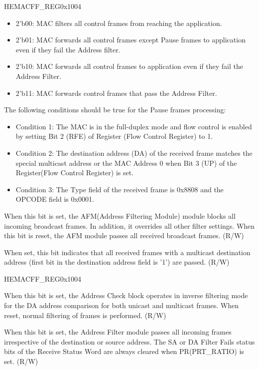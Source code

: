 \begin{register}{H}{EMACFF\_REG}{0x1004}
\begin{regdesc}
\begin{reglist}
\begin{itemize}
\item 2'b00: MAC filters all control frames from reaching the application. \item 2'b01: MAC forwards all control frames except Pause frames to application even if they fail the Address filter. \item 2'b10: MAC forwards all control frames to application even if they fail the Address Filter. \item 2'b11: MAC forwards control frames that pass the Address Filter.
\end{itemize}
The following conditions should be true for the Pause frames processing: \begin{itemize}
\item Condition 1: The MAC is in the full-duplex mode and flow control is enabled by setting Bit 2 (RFE) of Register (Flow Control Register) to 1.
\item Condition 2: The destination address (DA) of the received frame matches the special multicast address or the MAC Address 0 when Bit 3 (UP) of the Register(Flow Control Register) is set.
\item  Condition 3: The Type field of the received frame is 0x8808 and the OPCODE field is 0x0001. \end{itemize}

\item [DBF]When this bit is set, the AFM(Address Filtering Module) module blocks all incoming broadcast frames. In addition, it overrides all other filter settings. When this bit is reset, the AFM module passes all received broadcast frames. (R/W)
\item [PAM]When set, this bit indicates that all received frames with a multicast destination address (first bit in the destination address field is '1') are passed. (R/W)
\item [Continued on the next page...]
\end{reglist}\end{regdesc}
\end{register}

\addtocounter{Regfloat}{-1}
\begin{register}{H}{EMACFF\_REG}{0x1004}
\begin{regdesc}\begin{reglist}
\item [Continued from the previous page...]
\item [DAIF]When this bit is set, the Address Check block operates in inverse filtering mode for the DA address comparison for both unicast and multicast frames. When reset, normal filtering of frames is performed. (R/W)
\item [PMODE]When this bit is set, the Address Filter module passes all incoming frames irrespective of the destination or source address. The SA or DA Filter Fails status bits of the Receive Status Word are always cleared when PR(PRT\_RATIO) is set. (R/W)
\end{reglist}\end{regdesc}
\end{register}


